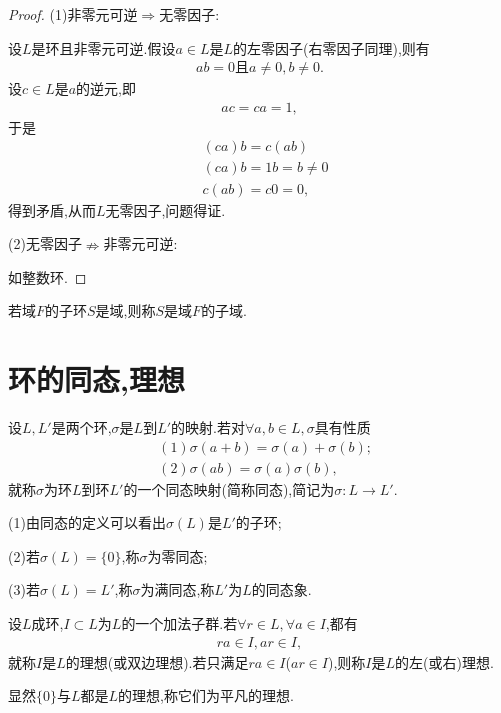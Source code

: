 \begin{proof}
    (1)非零元可逆$\Rightarrow$无零因子:

    设$L$是环且非零元可逆.假设$a\in L$是$L$的左零因子(右零因子同理),则有\begin{align*}
        ab=0\text{且}a\neq0,b\neq0.
    \end{align*}设$c\in L$是$a$的逆元,即\begin{align*}
        ac=ca=1,
    \end{align*}于是\begin{align*}
        &(ca)b=c(ab)\\
        &(ca)b=1b=b\neq0\\
        &c(ab)=c0=0,
    \end{align*}得到矛盾,从而$L$无零因子,问题得证.

    (2)无零因子$\nRightarrow$非零元可逆:

    如整数环.
\end{proof}
\begin{definition}[子域]
    若域$F$的子环$S$是域,则称$S$是域$F$的子域.
\end{definition}
\section{环的同态,理想}
\begin{definition}[同态]
    设$L,L'$是两个环,$\sigma$是$L$到$L'$的映射.若对$\forall a,b\in L,\sigma$具有性质\begin{align*}
        &(1)\sigma(a+b)=\sigma(a)+\sigma(b);\\
        &(2)\sigma(ab)=\sigma(a)\sigma(b),
    \end{align*}就称$\sigma$为环$L$到环$L'$的一个同态映射(简称同态),简记为$\sigma:L\to L'$.
\end{definition}
\begin{remark}
    (1)由同态的定义可以看出$\sigma(L)$是$L'$的子环;

    (2)若$\sigma(L)=\{0\}$,称$\sigma$为零同态;

    (3)若$\sigma(L)=L'$,称$\sigma$为满同态,称$L'$为$L$的同态象.
\end{remark}
\begin{definition}[理想]
    设$L$成环,$I\subset L$为$L$的一个加法子群.若$\forall r\in L,\forall a\in I$,都有\begin{align*}
        ra\in I,ar\in I,
    \end{align*}就称$I$是$L$的理想(或双边理想).若只满足$ra\in I$($ar\in I$),则称$I$是$L$的左(或右)理想.
\end{definition}
\begin{remark}
    显然$\{0\}$与$L$都是$L$的理想,称它们为平凡的理想.
\end{remark}
